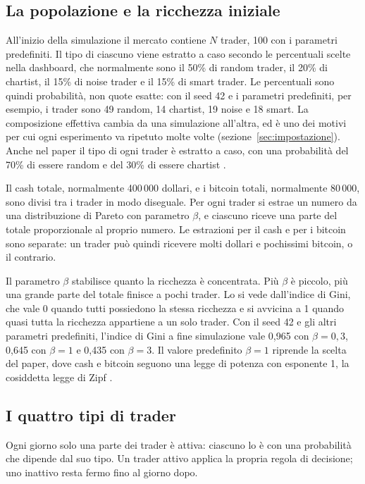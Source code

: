 \subsection{La popolazione e la ricchezza iniziale}

All'inizio della simulazione il mercato contiene $N$ trader, 100 con i parametri predefiniti. Il tipo di ciascuno viene estratto a caso secondo le percentuali scelte nella dashboard, che normalmente sono il 50\% di random trader, il 20\% di chartist, il 15\% di noise trader e il 15\% di smart trader. Le percentuali sono quindi probabilità, non quote esatte: con il seed 42 e i parametri predefiniti, per esempio, i trader sono 49 random, 14 chartist, 19 noise e 18 smart. La composizione effettiva cambia da una simulazione all'altra, ed è uno dei motivi per cui ogni esperimento va ripetuto molte volte (sezione~\ref{sec:impostazione}). Anche nel paper il tipo di ogni trader è estratto a caso, con una probabilità del 70\% di essere random e del 30\% di essere chartist \cite{paper_riferimento}.

Il cash totale, normalmente 400\,000 dollari, e i bitcoin totali, normalmente 80\,000, sono divisi tra i trader in modo diseguale. Per ogni trader si estrae un numero da una distribuzione di Pareto con parametro $\beta$, e ciascuno riceve una parte del totale proporzionale al proprio numero. Le estrazioni per il cash e per i bitcoin sono separate: un trader può quindi ricevere molti dollari e pochissimi bitcoin, o il contrario.

Il parametro $\beta$ stabilisce quanto la ricchezza è concentrata. Più $\beta$ è piccolo, più una grande parte del totale finisce a pochi trader. Lo si vede dall'indice di Gini, che vale 0 quando tutti possiedono la stessa ricchezza e si avvicina a 1 quando quasi tutta la ricchezza appartiene a un solo trader. Con il seed 42 e gli altri parametri predefiniti, l'indice di Gini a fine simulazione vale 0,965 con $\beta = 0{,}3$, 0,645 con $\beta = 1$ e 0,435 con $\beta = 3$. Il valore predefinito $\beta = 1$ riprende la scelta del paper, dove cash e bitcoin seguono una legge di potenza con esponente 1, la cosiddetta legge di Zipf \cite{paper_riferimento}.

\subsection{I quattro tipi di trader}

Ogni giorno solo una parte dei trader è attiva: ciascuno lo è con una probabilità che dipende dal suo tipo. Un trader attivo applica la propria regola di decisione; uno inattivo resta fermo fino al giorno dopo.

